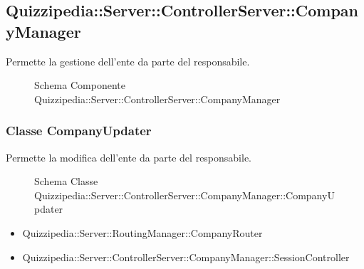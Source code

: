 \subsection{Quizzipedia::Server::ControllerServer::CompanyManager}
Permette la gestione dell'ente da parte del responsabile.
\begin{figure}[H]
\centering
\noindent{}
\caption[Schema Componente Quizzipedia::Server::ControllerServer::CompanyManager]{Schema Componente Quizzipedia::Server::ControllerServer::CompanyManager}
\end{figure}
\subsubsection{Classe CompanyUpdater}
Permette la modifica dell'ente da parte del responsabile.
\begin{figure}[H]
\centering
\noindent{}
\caption[Schema Classe CompanyUpdater]{Schema Classe Quizzipedia::Server::ControllerServer::CompanyManager::CompanyUpdater}
\end{figure}
\begin{itemize}
\item Quizzipedia::Server::RoutingManager::CompanyRouter
\end{itemize}
\begin{itemize}
\item Quizzipedia::Server::ControllerServer::CompanyManager::SessionController
\end{itemize}
